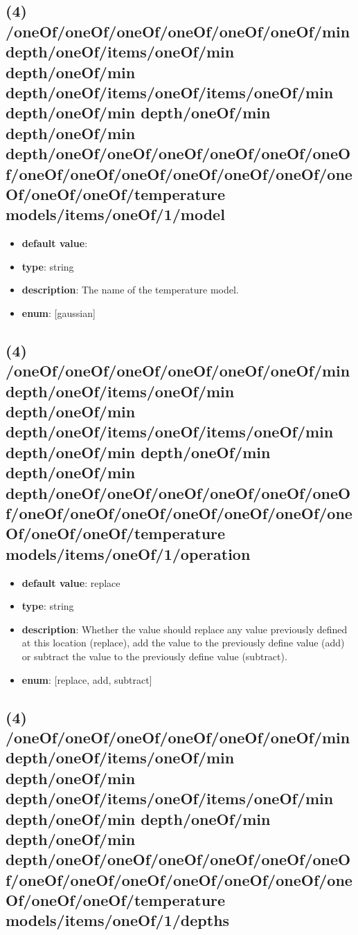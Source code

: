\subsection{(4) /oneOf/oneOf/oneOf/oneOf/oneOf/oneOf/min depth/oneOf/items/oneOf/min depth/oneOf/min depth/oneOf/items/oneOf/items/oneOf/min depth/oneOf/min depth/oneOf/min depth/oneOf/min depth/oneOf/oneOf/oneOf/oneOf/oneOf/oneOf/oneOf/oneOf/oneOf/oneOf/oneOf/oneOf/oneOf/oneOf/oneOf/temperature models/items/oneOf/1/model}
\begin{itemize}[leftmargin=4em]\item {\bf default value}: 
\item {\bf type}: string
\item {\bf description}: The name of the temperature model.
\item {\bf enum}: [gaussian]\end{itemize}\subsection{(4) /oneOf/oneOf/oneOf/oneOf/oneOf/oneOf/min depth/oneOf/items/oneOf/min depth/oneOf/min depth/oneOf/items/oneOf/items/oneOf/min depth/oneOf/min depth/oneOf/min depth/oneOf/min depth/oneOf/oneOf/oneOf/oneOf/oneOf/oneOf/oneOf/oneOf/oneOf/oneOf/oneOf/oneOf/oneOf/oneOf/oneOf/temperature models/items/oneOf/1/operation}
\begin{itemize}[leftmargin=4em]\item {\bf default value}: replace
\item {\bf type}: string
\item {\bf description}: Whether the value should replace any value previously defined at this location (replace), add the value to the previously define value (add) or subtract the value to the previously define value (subtract).
\item {\bf enum}: [replace, add, subtract]\end{itemize}\subsection{(4) /oneOf/oneOf/oneOf/oneOf/oneOf/oneOf/min depth/oneOf/items/oneOf/min depth/oneOf/min depth/oneOf/items/oneOf/items/oneOf/min depth/oneOf/min depth/oneOf/min depth/oneOf/min depth/oneOf/oneOf/oneOf/oneOf/oneOf/oneOf/oneOf/oneOf/oneOf/oneOf/oneOf/oneOf/oneOf/oneOf/oneOf/temperature models/items/oneOf/1/depths}
